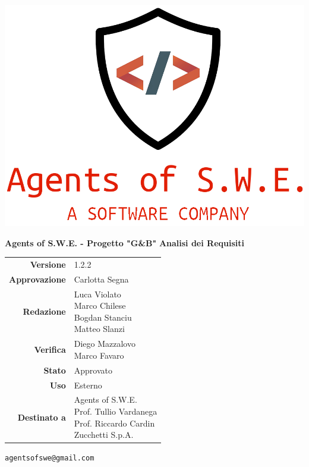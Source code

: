 


\begin{titlepage}
\thispagestyle{empty}

\begin{center}

\includegraphics[scale=0.3]{./images/logo.png} 

\large \textbf{Agents of S.W.E. - Progetto "G\&B"}
\vfill
\Huge \textbf{Analisi dei Requisiti}
\vfill
\large
\renewcommand{\arraystretch}{1.3}
\begin{tabular}{r|l}
\textbf{Versione} & 1.2.2\\
\textbf{Approvazione} & Carlotta Segna\\
\textbf{Redazione} & \parbox[t]{5cm}{Luca Violato\\Marco Chilese\\Bogdan Stanciu\\Matteo Slanzi}\\
\textbf{Verifica} & \parbox[t]{5cm}{Diego Mazzalovo\\Marco Favaro}\\
\textbf{Stato} & Approvato\\
\textbf{Uso} & Esterno\\
\textbf{Destinato a} & \parbox[t]{5cm}{Agents of S.W.E. \\Prof. Tullio Vardanega\\Prof. Riccardo Cardin \\ Zucchetti S.p.A.}
\end{tabular}
\vfill
\small
\texttt{agentsofswe@gmail.com}
\end{center}
\end{titlepage}

